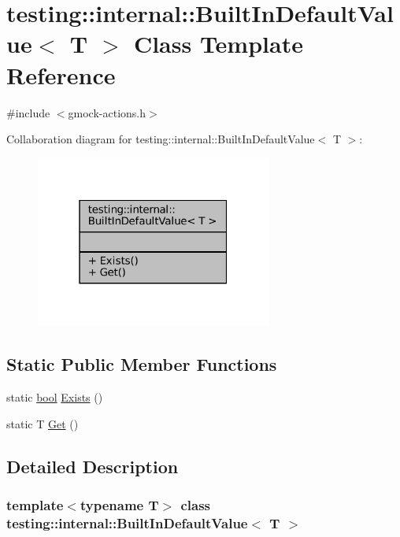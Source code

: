 \hypertarget{classtesting_1_1internal_1_1BuiltInDefaultValue}{}\section{testing\+:\+:internal\+:\+:Built\+In\+Default\+Value$<$ T $>$ Class Template Reference}
\label{classtesting_1_1internal_1_1BuiltInDefaultValue}


{\ttfamily \#include $<$gmock-\/actions.\+h$>$}



Collaboration diagram for testing\+:\+:internal\+:\+:Built\+In\+Default\+Value$<$ T $>$\+:
\nopagebreak
\begin{figure}[H]
\begin{center}
\leavevmode
\includegraphics[width=220pt]{classtesting_1_1internal_1_1BuiltInDefaultValue__coll__graph}
\end{center}
\end{figure}
\subsection*{Static Public Member Functions}
\begin{DoxyCompactItemize}
\item 
static \hyperlink{classbool}{bool} \hyperlink{classtesting_1_1internal_1_1BuiltInDefaultValue_a35207bc20a493b0efb3980eb9a08dd2f}{Exists} ()
\item 
static T \hyperlink{classtesting_1_1internal_1_1BuiltInDefaultValue_a7e26c1df14a887c8f393b29d6ea162e6}{Get} ()
\end{DoxyCompactItemize}


\subsection{Detailed Description}
\subsubsection*{template$<$typename T$>$\newline
class testing\+::internal\+::\+Built\+In\+Default\+Value$<$ T $>$}



